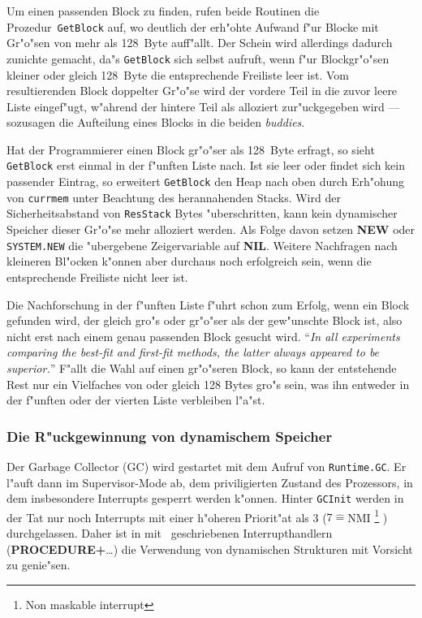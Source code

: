 Um einen passenden Block zu finden, rufen beide Routinen die Prozedur~{\tt GetBlock}
auf, wo deutlich der erh"ohte Aufwand f"ur Blocke mit Gr"o"sen von mehr als
128~Byte auff"allt.
Der Schein wird allerdings dadurch zunichte gemacht, da"s {\tt GetBlock} sich
selbst aufruft, wenn f"ur Blockgr"o"sen kleiner oder gleich 128~Byte die
entsprechende Freiliste leer ist.
Vom resultierenden Block doppelter Gr"o"se wird der vordere Teil in die
zuvor leere Liste eingef"ugt, w"ahrend der hintere Teil als alloziert
zur"uckgegeben wird --- sozusagen die Aufteilung eines Blocks in die beiden
{\it buddies}.

Hat der Programmierer einen Block gr"o"ser als 128~Byte erfragt, so
sieht {\tt GetBlock} erst einmal in der f"unften Liste nach.
Ist sie leer oder findet sich kein passender Eintrag, so erweitert {\tt GetBlock}
den Heap nach oben durch Erh"ohung von {\tt currmem} unter Beachtung des
herannahenden Stacks.
Wird der Sicherheitsabstand von {\tt ResStack} Bytes "uberschritten,
kann kein dynamischer Speicher dieser Gr"o"se mehr alloziert werden.
Als Folge davon setzen {\bf NEW} oder {\tt SYSTEM.NEW} die "ubergebene
Zeigervariable auf {\bf NIL}.
Weitere Nachfragen nach kleineren Bl"ocken k"onnen aber durchaus noch
erfolgreich sein, wenn die entsprechende Freiliste nicht leer ist.

Die Nachforschung in der f"unften Liste f"uhrt schon zum Erfolg, wenn
ein Block gefunden wird, der gleich gro"s oder gr"o"ser als der
gew"unschte Block ist, also nicht erst nach einem genau passenden Block
gesucht wird.
``{\it In all experiments comparing the best-fit and first-fit methods,
the latter always appeared to be superior.}''\cite[S.~448]{artProgramming}
F"allt die Wahl auf einen gr"o"seren Block, so kann der entstehende Rest
nur ein Vielfaches von oder gleich 128 Bytes gro"s sein, was ihn entweder
in der f"unften oder der vierten Liste verbleiben l"a"st.


\subsubsection{Die R"uckgewinnung von dynamischem Speicher}

Der Garbage Collector (GC) wird gestartet mit dem Aufruf von {\tt Runtime.GC}.
Er l"auft dann im Supervisor-Mode ab, dem priviligierten Zustand des
Prozessors, in dem insbesondere Interrupts gesperrt werden k"onnen.
Hinter {\tt GCInit} werden in der Tat nur noch Interrupts mit einer
h"oheren Priorit"at als 3 ($7\mathrel{\widehat=}$NMI%
\footnote{Non maskable interrupt}%
) durchgelassen.
Daher ist in mit \oberon\ geschriebenen Interrupthandlern ({\bf PROCEDURE+}\ldots)
die Verwendung von dynamischen Strukturen mit Vorsicht zu genie"sen.


